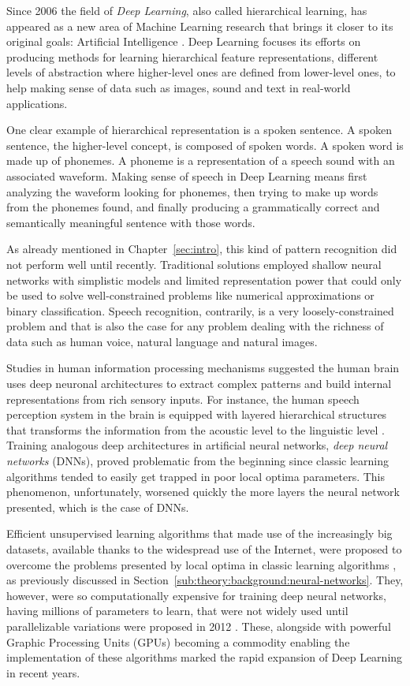 Since 2006 the field of \emph{Deep Learning}, also called hierarchical learning, has appeared as a new area of Machine Learning research that brings it closer to its original goals: Artificial Intelligence \cite{Deng2014}.
Deep Learning focuses its efforts on producing methods for learning hierarchical feature representations, different levels of abstraction where higher-level ones are defined from lower-level ones, to help making sense of data such as images, sound and text in real-world applications.

One clear example of hierarchical representation is a spoken sentence.
A spoken sentence, the higher-level concept, is composed of spoken words.
A spoken word is made up of phonemes.
A phoneme is a representation of a speech sound with an associated waveform.
Making sense of speech in Deep Learning means first analyzing the waveform looking for phonemes, then trying to make up words from the phonemes found, and finally producing a grammatically correct and semantically meaningful sentence with those words.

As already mentioned in Chapter~\ref{sec:intro}, this kind of pattern recognition did not perform well until recently.
Traditional solutions employed shallow neural networks with simplistic models and limited representation power that could only be used to solve well-constrained problems like numerical approximations or binary classification.
Speech recognition, contrarily, is a very loosely-constrained problem and that is also the case for any problem dealing with the richness of data such as human voice, natural language and natural images.

Studies in human information processing mechanisms suggested the human brain uses deep neuronal architectures to extract complex patterns and build internal representations from rich sensory inputs.
For instance, the human speech perception system in the brain is equipped with layered hierarchical structures that transforms the information from the acoustic level to the linguistic level \cite{Deng1999,Baker2009}.
Training analogous deep architectures in artificial neural networks, \emph{deep neural networks} (DNNs), proved problematic from the beginning since classic learning algorithms tended to easily get trapped in poor local optima parameters.
This phenomenon, unfortunately, worsened quickly the more layers the neural network presented, which is the case of DNNs.

Efficient unsupervised learning algorithms that made use of the increasingly big datasets, available thanks to the widespread use of the Internet, were proposed to overcome the problems presented by local optima in classic learning algorithms \cite{LeCun2004,Hinton2006}, as previously discussed in Section~\ref{sub:theory:background:neural-networks}.
They, however, were so computationally expensive for training deep neural networks, having millions of parameters to learn, that were not widely used until parallelizable variations were proposed in 2012 \cite{Dean2012,Chen2012}.
These, alongside with powerful Graphic Processing Units (GPUs) becoming a commodity enabling the implementation of these algorithms marked the rapid expansion of Deep Learning in recent years.


